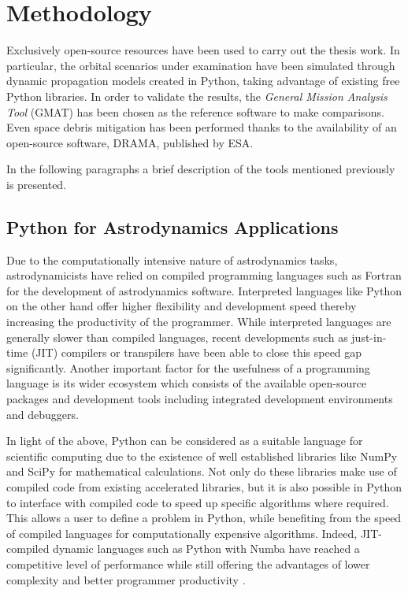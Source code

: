 \chapter{Methodology}

Exclusively open-source resources have been used to carry out the thesis work. 
In particular, the orbital scenarios under examination have been simulated through dynamic propagation models created in Python, taking advantage of existing free Python libraries.   
In order to validate the results, the \textit{General Mission Analysis Tool} (GMAT) has been chosen as the reference software to make comparisons.
Even space debris mitigation has been performed thanks to the availability of an open-source software, DRAMA, published by ESA.

In the following paragraphs a brief description of the tools mentioned previously is presented.

\section{Python for Astrodynamics Applications}

Due to the computationally intensive nature of astrodynamics tasks, astrodynamicists have relied on compiled programming languages such as Fortran for the development of astrodynamics software.
Interpreted languages like Python on the other hand offer higher flexibility and development speed thereby increasing the productivity of the programmer.
While interpreted languages are generally slower than compiled languages, recent developments such as just-in-time (JIT) compilers or transpilers have been able to close this speed gap significantly. 
Another important factor for the usefulness of a programming language is its wider ecosystem which consists of the available open-source packages and development tools including integrated development environments and debuggers. 

In light of the above, Python can be considered as a suitable language for scientific computing due to the existence of well established libraries like NumPy and SciPy for mathematical calculations.
Not only do these libraries make use of compiled code from existing accelerated libraries, but it is also possible in Python to interface with compiled code to speed up specific algorithms where required.
This allows a user to define a problem in Python, while benefiting from the speed of compiled languages for computationally expensive algorithms.
Indeed, JIT-compiled dynamic languages such as Python with Numba have reached a competitive level of performance while still offering the advantages of lower complexity and better programmer productivity
\cite{eichhorn2018comparative}.

